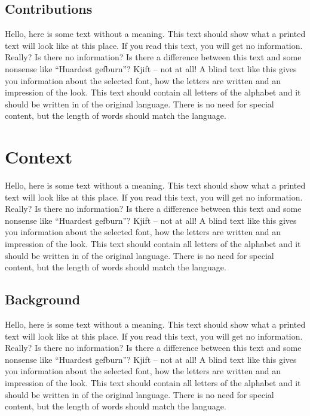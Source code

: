 \documentclass[%
  english,%
  todotools=true,%
  trtype=proceedings%
]{hpitr}
\begin{document}
\subsection{Contributions}
\label{sec:contributions}

Hello, here is some text without a meaning. This text should show
what a printed text will look like at this place. If you read this
text, you will get no information. Really? Is there no information?
Is there a difference between this text and some nonsense like
“Huardest gefburn”? Kjift – not at all! A blind text like this gives
you information about the selected font, how the letters are written
and an impression of the look. This text should contain all letters
of the alphabet and it should be written in of the original
language. There is no need for special content, but the length of
words should match the language.

\section{Context}
\label{sec:context}

Hello, here is some text without a meaning. This text should show
what a printed text will look like at this place. If you read this
text, you will get no information. Really? Is there no information?
Is there a difference between this text and some nonsense like
“Huardest gefburn”? Kjift – not at all! A blind text like this gives
you information about the selected font, how the letters are written
and an impression of the look. This text should contain all letters
of the alphabet and it should be written in of the original
language. There is no need for special content, but the length of
words should match the language.


\subsection{Background}
\label{sec:background}

Hello, here is some text without a meaning. This text should show
what a printed text will look like at this place. If you read this
text, you will get no information. Really? Is there no information?
Is there a difference between this text and some nonsense like
“Huardest gefburn”? Kjift – not at all! A blind text like this gives
you information about the selected font, how the letters are written
and an impression of the look. This text should contain all letters
of the alphabet and it should be written in of the original
language. There is no need for special content, but the length of
words should match the language.
\end{document}
